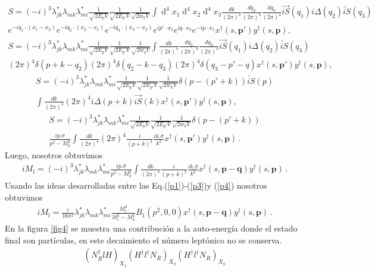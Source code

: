\begin{align}
S=(-i)^{3}\lambda^ *_{jk}\lambda_{mk}\lambda^*_{mi}\frac{1}{\sqrt{2E_p V}}\frac{1}{\sqrt{2E_{p'} V}}\frac{1}{\sqrt{2w_k V}}\int\operatorname{d}^{4}x_{1}\operatorname{d}^{4}x_{2}
\operatorname{d}^{4}x_{3} \frac{dk}{(2\pi)^4}\frac{dq_{2}}{(2\pi)^4}\frac{dq_{3}}{(2\pi)^4}\overrightarrow{iS}(q_{1})i\Delta(q_{2})\overleftarrow{iS}(q_{3})\nonumber\\ 
e^{-iq_{1}\cdot (x_{1}-x_{2})}e^{-iq_{2}\cdot (x_{2}-x_{1})}e^{-iq_{3}\cdot (x_{3}-x_{2})}e^{i p'\cdot x_{3}}e^{i q\cdot x_{3}}e^{-i p\cdot x_{1}}x^\dagger(s,\boldsymbol{p'})y^\dagger(s,\boldsymbol{p}),
\end{align}
\begin{align}
S=(-i)^{3}\lambda^ *_{jk}\lambda_{mk}\lambda^*_{mi}\frac{1}{\sqrt{2E_p V}}\frac{1}{\sqrt{2E_{p'} V}}\frac{1}{\sqrt{2w_q V}}\int \frac{dk}{(2\pi)^4}\frac{dq_{2}}{(2\pi)^4}\frac{dq_{3}}{(2\pi)^4}\overrightarrow{iS}(q_{1})i\Delta(q_{2})\overleftarrow{iS}(q_{3})\nonumber\\(2\pi)^4\delta(p+k-q_{2})(2\pi)^4\delta(q_{2}-k-q_{3})(2\pi)^4\delta(q_{3}-p'-q)x^\dagger(s,\boldsymbol{p'})y^\dagger(s,\boldsymbol{p}),
\end{align}
\begin{align}
S=(-i)^{3}\lambda^ *_{jk}\lambda_{mk}\lambda^*_{mi}\frac{1}{\sqrt{2E_p V}}\frac{1}{\sqrt{2E_{p'} V}}\frac{1}{\sqrt{2w_k V}}\delta(p-(p'+k))\overleftarrow{iS}(p)\nonumber \\ \int \frac{dk}{(2\pi)^4} (2\pi)^4 i\Delta(p+k)\overrightarrow{iS}(k)x^\dagger(s,\boldsymbol{p'})y^\dagger(s,\boldsymbol{p}),
\end{align}
\begin{align}
S=(-i)^{3}\lambda^ *_{jk}\lambda_{mk}\lambda^*_{mi}\frac{1}{\sqrt{2E_p V}}\frac{1}{\sqrt{2E_{p'} V}}\frac{1}{\sqrt{2w_k V}}\delta(p-(p'+k))\\
\frac{ip.\sigma}{p^2-M_{k}^2}\int \frac{dk}{(2\pi)^4}(2\pi)^4\frac{i}{(p+k)^2}\frac{ik.\bar{\sigma}}{k^2}x^\dagger(s,\boldsymbol{p'})y^\dagger(s,\boldsymbol{p})\, . 
\end{align}
Luego, nosotros obtuvimos
\begin{align}
iM_{l}=(-i)^{3}\lambda^ *_{jk}\lambda_{mk}\lambda^*_{mi}\frac{ip.\bar{\sigma}}{p^2-M_{k}^2}\int \frac{dk}{(2\pi)^4}\frac{i}{(p+k)^2}\frac{ik.\bar{\sigma}}{k^2}x^\dagger(s,\boldsymbol{p-q})y^\dagger(s,\boldsymbol{p})\, . 
\end{align}
Usando las ideas desarrolladas entre las Eq.(\ref{p1})-(\ref{p3})y (\ref{p4}) nosotros obtuvimos 
\begin{align}
iM_{l}=\frac{i}{16\pi^2}\lambda^*_{jk}\lambda_{mk}\lambda^*_{mi}
\frac{M_i^2}{M_i^2-M_{k}^2}B_{1}(p^2,0,0)x^\dagger(s,\boldsymbol{p-q})y^\dagger(s,\boldsymbol{p})\, . 
\end{align}
En la figura \ref{fig4} se muestra una contribución a la auto-energía donde el estado final son partículas, en este decaimiento el número leptónico  no se conserva.
\begin{align}
(N_{R}^{\dagger}lH)_{X_{1}}
(H^{\dagger}l^{\dagger}N_{R})_{X_{2}}
(H^{\dagger}l^{\dagger} N_{R})_{X_{3}}
\end{align}


